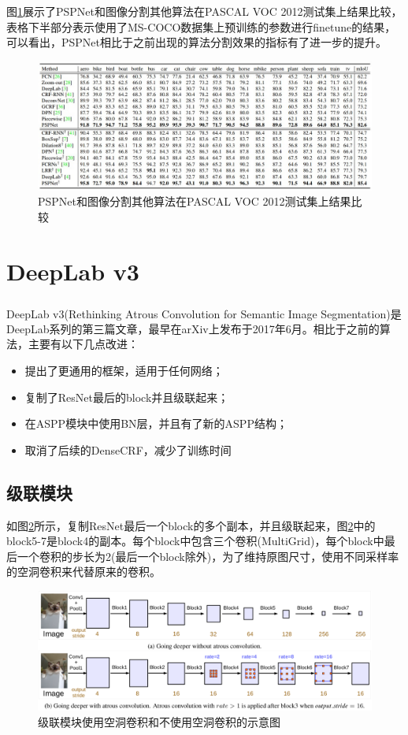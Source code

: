\documentclass[cn]{elegantbook}
\newcommand{\upcite}[1]{\textsuperscript{\textsuperscript{\cite{#1}}}}
\begin{document}
图\ref{pspnet2}展示了PSPNet和图像分割其他算法在PASCAL VOC 2012测试集上结果比较，表格下半部分表示使用了MS-COCO数据集上预训练的参数进行finetune的结果，可以看出，PSPNet相比于之前出现的算法分割效果的指标有了进一步的提升。
\begin{figure}[!h]
	\centering
	\includegraphics[width=\textwidth]{images/pspnet2.jpg}
	\caption{\label{pspnet2}PSPNet和图像分割其他算法在PASCAL VOC 2012测试集上结果比较}
\end{figure}

\section{DeepLab v3}
DeepLab v3(Rethinking Atrous Convolution for Semantic Image Segmentation)\upcite{chen2017rethinking}是DeepLab系列的第三篇文章，最早在arXiv上发布于2017年6月。相比于之前的算法，主要有以下几点改进：
\begin{itemize}
	\item 提出了更通用的框架，适用于任何网络；
	\item 复制了ResNet最后的block并且级联起来；
	\item 在ASPP模块中使用BN层，并且有了新的ASPP结构；
	\item 取消了后续的DenseCRF，减少了训练时间
\end{itemize}

\subsection{级联模块}
如图\ref{deeplabv3}所示，复制ResNet最后一个block的多个副本，并且级联起来，图\ref{deeplabv3}中的block5-7是block4的副本。每个block中包含三个卷积(MultiGrid)，每个block中最后一个卷积的步长为2(最后一个block除外)，为了维持原图尺寸，使用不同采样率的空洞卷积来代替原来的卷积。
\begin{figure}[!h]
	\centering
	\includegraphics[width=\textwidth]{images/deeplabv3.png}
	\caption{\label{deeplabv3}级联模块使用空洞卷积和不使用空洞卷积的示意图}
\end{figure}
\end{document}
